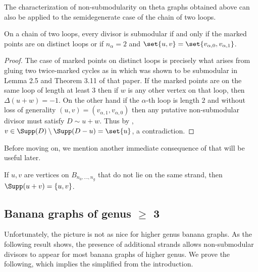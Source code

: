The characterization of non-submodularity on theta graphs obtained above can also be applied to the semidegenerate case of the chain of two loops. 

\begin{prop}\label{rem-degenerateTheta}
    On a chain of two loops, every divisor is submodular if and only if the marked points are on distinct loops or if $n_\alpha = 2$ and $\set{u,v} = \set{v_{\alpha,0},v_{\alpha,1}}$.
\end{prop}

\begin{proof}
    The case of marked points on distinct loops is precisely what arises from gluing two twice-marked cycles as in \cite{Pfl22} which was shown to be submodular in Lemma 2.5 and Theorem 3.11 of that paper. If the marked points are on the same loop of length at least $3$ then if $w$ is any other vertex on that loop, then $\Delta(u+w) = -1$. On the other hand if the $\alpha$-th loop is length $2$ and without loss of generality $(u,v) = (v_{\alpha,1},v_{\alpha,0})$ then any putative non-submodular divisor must satisfy $D \sim u+w$. Thus by , $v \in \Supp(D)\setminus \Supp(D-u) = \set{u}$, a contradiction. 
\end{proof}

Before moving on, we mention another immediate consequence of  that will be useful later.

\begin{coro}\label{cor:suppUV}
If $u,v$ are vertices on $B_{n_0, \ldots, n_g}$ that do not lie on the same strand, then $\Supp(u+v) = \{u,v\}$.
\end{coro}

\subsection{Banana graphs of genus \texorpdfstring{$\geq$}{≥} 3}
Unfortunately, the picture is not as nice for higher genus banana graphs. As the following result shows, the presence of additional strands allows non-submodular divisors to appear for most banana graphs of higher genus. We prove the following, which implies the simplified  from the introduction.


